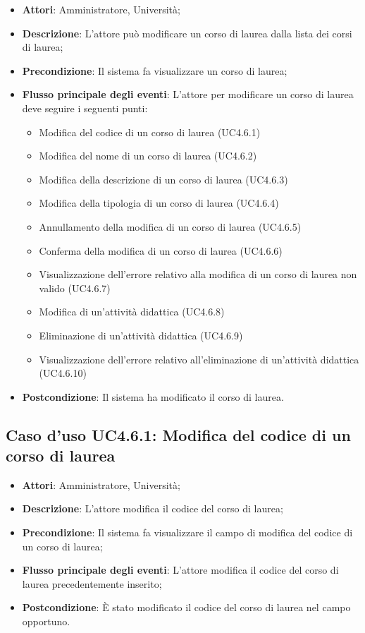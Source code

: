 \begin{itemize}
\item \textbf{Attori}: Amministratore, Università;
\item \textbf{Descrizione}: L'attore può modificare un corso di laurea dalla lista dei corsi di laurea;

\item \textbf{Precondizione}: Il sistema fa visualizzare un corso di laurea;

\item \textbf{Flusso principale degli eventi}: L'attore per modificare un corso di laurea deve seguire i seguenti punti:

\begin{itemize}
\item Modifica del codice di un corso di laurea (UC4.6.1)
\item Modifica del nome di un corso di laurea (UC4.6.2)
\item Modifica della descrizione di un corso di laurea (UC4.6.3)
\item Modifica della tipologia di un corso di laurea (UC4.6.4)
\item Annullamento della modifica di un corso di laurea (UC4.6.5)
\item Conferma della modifica di un corso di laurea (UC4.6.6)
\item Visualizzazione dell'errore relativo alla modifica di un corso di laurea non valido (UC4.6.7)
\item Modifica di un'attività didattica (UC4.6.8)
\item Eliminazione di un'attività didattica (UC4.6.9)
\item Visualizzazione dell'errore relativo all'eliminazione di un'attività didattica (UC4.6.10)
\end{itemize}
\item \textbf{Postcondizione}: Il sistema ha modificato il corso di laurea.

\end{itemize}
\subsection{Caso d'uso \texorpdfstring{UC4.6.1}{UC4.6.1}: Modifica del codice di un corso di laurea}
\begin{itemize}
\item \textbf{Attori}: Amministratore, Università;
\item \textbf{Descrizione}: L'attore modifica il codice del corso di laurea;

\item \textbf{Precondizione}: Il sistema fa visualizzare il campo di modifica del codice di un corso di laurea;
\item \textbf{Flusso principale degli eventi}: L'attore modifica il codice del corso di laurea precedentemente inserito;

\item \textbf{Postcondizione}: È stato modificato il codice del corso di laurea nel campo opportuno.


\end{itemize}
